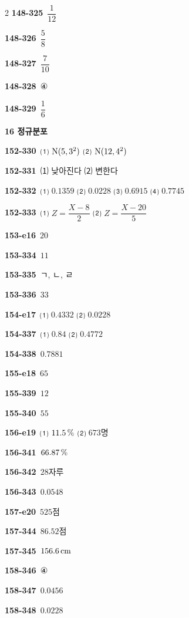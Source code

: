 \documentclass[10pt,a4paper]{article}
\begin{document}
\begin{multicols}{2}
\noindent\textbf{148-325}\ $\dfrac{1}{12}$\par
\noindent\textbf{148-326}\ $\dfrac{5}{8}$\par
\noindent\textbf{148-327}\ $\dfrac{7}{10}$\par
\noindent\textbf{148-328}\ ④\par
\noindent\textbf{148-329}\ $\dfrac{1}{6}$\par
\noindent\textbf{16 정규분포}\par\smallskip
\noindent\textbf{152-330}\ ⑴ $\mathrm{N}(5{,}\mkern3mu\mathopen{}3^2)$ ⑵ $\mathrm{N}(12{,}\mkern3mu\mathopen{}4^2)$\par
\noindent\textbf{152-331}\ ⑴ 낮아진다 ⑵ 변한다\par
\noindent\textbf{152-332}\ ⑴ $0.1359$ ⑵ $0.0228$ ⑶ $0.6915$ ⑷ $0.7745$\par
\noindent\textbf{152-333}\ ⑴ $Z=\dfrac{X-8}{2}$ ⑵ $Z=\dfrac{X-20}{5}$\par
\noindent\textbf{153-e16}\ $20$\par
\noindent\textbf{153-334}\ $11$\par
\noindent\textbf{153-335}\ ㄱ, ㄴ, ㄹ\par
\noindent\textbf{153-336}\ $33$\par
\noindent\textbf{154-e17}\ ⑴ $0.4332$ ⑵ $0.0228$\par
\noindent\textbf{154-337}\ ⑴ $0.84$ ⑵ $0.4772$\par
\noindent\textbf{154-338}\ $0.7881$\par
\noindent\textbf{155-e18}\ $65$\par
\noindent\textbf{155-339}\ $12$\par
\noindent\textbf{155-340}\ $55$\par
\noindent\textbf{156-e19}\ ⑴ $11.5\mkern3mu \%$ ⑵ $673$명\par
\noindent\textbf{156-341}\ $66.87\mkern3mu \%$\par
\noindent\textbf{156-342}\ $28$자루\par
\noindent\textbf{156-343}\ $0.0548$\par
\noindent\textbf{157-e20}\ $525$점\par
\noindent\textbf{157-344}\ $86.52$점\par
\noindent\textbf{157-345}\ $156.6\mkern3mu \mathrm{cm}$\par
\noindent\textbf{158-346}\ ④\par
\noindent\textbf{158-347}\ $0.0456$\par
\noindent\textbf{158-348}\ $0.0228$\par

\end{multicols}
\end{document}
